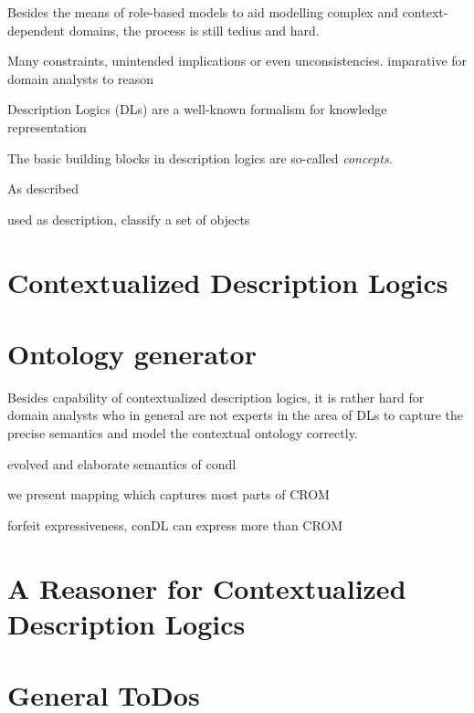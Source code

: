Besides the means of role-based models to aid modelling complex and context-dependent
domains, the process is still tedius and hard. 

Many constraints, unintended implications or even unconsistencies. imparative for domain analysts to reason


Description Logics (DLs) are a well-known formalism for knowledge representation



The basic building blocks in description logics are so-called \emph{concepts}. 

As described

used as description, classify a set of objects

\section{Contextualized Description Logics}
\label{sec:intro-contextualized-description-logics}


\blindtext

\section{Ontology generator}
\label{sec:zweite-section}

Besides capability of contextualized description logics, it is rather hard for domain analysts who
in general are not experts in the area of DLs to capture the precise semantics and model the
contextual ontology correctly. 

evolved and elaborate semantics of condl

we present mapping which captures most parts of CROM

forfeit expressiveness, conDL can express more than CROM


\blindtext 


\section{A Reasoner for Contextualized Description Logics}
\label{sec:intro-reasoner}


\blindtext




\clearpage

\section{General ToDos}
\label{sec:todos}





